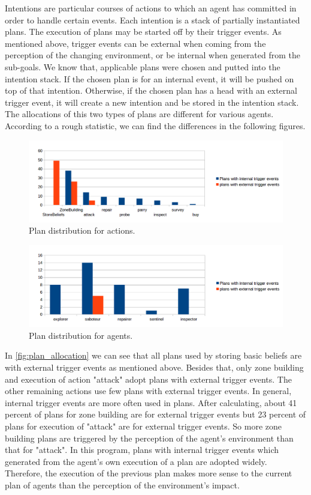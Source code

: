 Intentions are particular courses of actions to which an agent has committed in order to handle certain events. Each intention is a stack of partially instantiated plans\cite{rafael_Javabased_2007}. The execution of plans may be started off by their trigger events. As mentioned above, trigger events can be external when coming from the perception of the changing environment, or be internal when generated from the sub-goals. We know that, applicable plans were chosen and putted into the intention stack. If the chosen plan is for an internal event, it will be pushed on top of that intention. Otherwise, if the chosen plan has a head with an external trigger event, it will create a new intention and be stored in the intention stack. The allocations of this two types of plans are different for various agents. According to a rough statistic, we can find the differences in the following figures.
\begin{figure}
  \centering
  \includegraphics[width=\textwidth]{images/BDI_plan_distribution_action}
  \caption{Plan distribution for actions.}
  \label{fig:plan_allocation}
\end{figure}
\begin{figure}
  \centering
  \includegraphics[width=\textwidth]{images/BDI_plan_distribution_role}
  \caption{Plan distribution for agents.}
  \label{fig:baselinex}
\end{figure}

In \autoref{fig:plan_allocation} we can see that all plans used by storing basic beliefs are with external trigger events as mentioned above. Besides that, only zone building and execution of action "attack" adopt plans with external trigger events. The other remaining actions use few plans with external trigger events. In general, internal trigger events are more often used in plans. After calculating, about 41 percent of plans for zone building are for external trigger events but 23 percent of plans for execution of "attack" are for external trigger events. So more zone building plans are triggered by the perception of the agent's environment than that for "attack". In this program, plans with internal trigger events which generated from the agent's own execution of a plan are adopted widely. Therefore, the execution of the previous plan makes more sense to the current plan of agents than the perception of the environment's impact.

